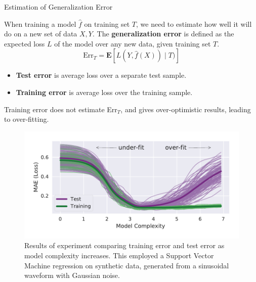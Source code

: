 \documentclass[final]{beamer}
\newlength{\onecolwid}
\begin{document}
\begin{frame}[t]
\begin{columns}[t]
\begin{column}{\onecolwid}

\begin{block}{Estimation of Generalization Error}

When training a model $\hat f$ on training set $T$, we need to estimate how well it will do on a new set of data $X, Y$.
The \textbf{generalization error} is defined as the expected loss $L$ of the model over any new data, given training set $T$.
\vspace{-0.5em}
\begin{equation}
\text{Err}_T = \mathbf{E}\left[ L(Y, \hat f(X)) \mid T ) \right]
\end{equation}

\begin{itemize}
    \item\textbf{Test error} is average loss over a separate test sample.
    \item\textbf{Training error} is average loss over the training sample. 
\end{itemize}



Training error does not estimate Err$_T$, and gives over-optimistic results, leading to over-fitting.

\vspace{0.5em}
\begin{figure}
    \includegraphics[width=\linewidth]{plots/b-v.pdf}
    \caption{Results of experiment comparing training error and test error as model complexity increases.
    This employed a Support Vector Machine regression on synthetic data, generated from a sinusoidal waveform with Gaussian noise.}
\end{figure}
\vspace{-1.0em}


\end{block}
\end{column}
\end{columns}
\end{frame}
\end{document}
